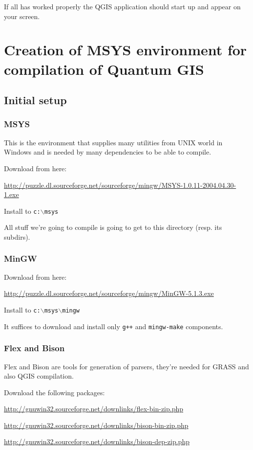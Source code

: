 If all has worked properly the QGIS application should start up and appear
on your screen.


\section{Creation of MSYS environment for compilation of Quantum GIS}
\subsection{Initial setup}
\subsubsection{MSYS}
This is the environment that supplies many utilities from UNIX world in Windows and is needed
by many dependencies to be able to compile.

Download from here:

\url{http://puzzle.dl.sourceforge.net/sourceforge/mingw/MSYS-1.0.11-2004.04.30-1.exe}

Install to \texttt{c:$\backslash$msys}

All stuff we're going to compile is going to get to this directory (resp. its subdirs).

\subsubsection{MinGW}
Download from here:

\url{http://puzzle.dl.sourceforge.net/sourceforge/mingw/MinGW-5.1.3.exe}

Install to \texttt{c:$\backslash$msys$\backslash$mingw}

It suffices to download and install only \texttt{g++} and \texttt{mingw-make} components.

\subsubsection{Flex and Bison}
Flex and Bison are tools for generation of parsers, they're needed for GRASS and also QGIS compilation.

Download the following packages:

\url{http://gnuwin32.sourceforge.net/downlinks/flex-bin-zip.php}

\url{http://gnuwin32.sourceforge.net/downlinks/bison-bin-zip.php}

\url{http://gnuwin32.sourceforge.net/downlinks/bison-dep-zip.php}

